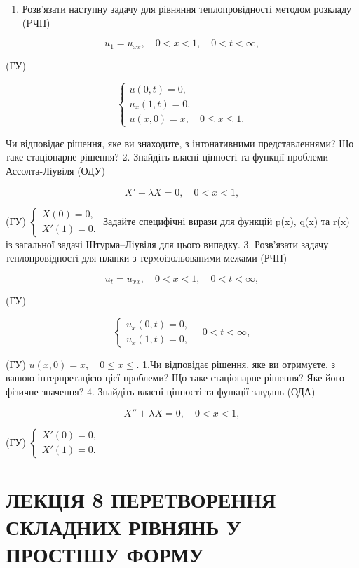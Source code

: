 \documentclass[
  ukrainian,
]{article}
\providecommand{\tightlist}{%
  \setlength{\itemsep}{0pt}\setlength{\parskip}{0pt}}
\begin{document}
\begin{enumerate}
\def\labelenumi{\arabic{enumi}.}
\tightlist
\item
  Розв'язати наступну задачу для рівняння теплопровідності методом
  розкладу (PЧП)
\end{enumerate}

\[
u_1 = u_{xx}, \quad 0 < x < 1, \quad 0 < t < \infty,
\]

(ГУ)

\[
\begin{cases} u(0, t) = 0, \\ u_x(1, t) = 0, \\ u(x, 0) = x, \quad 0 \le x \le 1. \end{cases}
\]

Чи відповідає рішення, яке ви знаходите, з інтонативними
представленнями? Що таке стаціонарне рішення? 2. Знайдіть власні
цінності та функції проблеми Ассолта-Ліувіля (ОДУ)

\[
X' + \lambda X = 0, \quad 0 < x < 1,
\]

(ГУ) \(\begin{cases} X(0) = 0, \\ X'(1) = 0. \end{cases}\) Задайте
специфічні вирази для функцій p(x), q(x) та r(x) із загальної задачі
Штурма--Ліувіля для цього випадку. 3. Розв'язати задачу теплопровідності
для планки з термоізольованими межами (РЧП)

\[
u_t = u_{xx}, \quad 0 < x < 1, \quad 0 < t < \infty,
\]

(ГУ)

\[
\begin{cases} u_x (0, t) = 0, \\ u_x (1, t) = 0, \end{cases} \quad 0 < t < \infty,
\]

(ГУ) \(u(x, 0) = x, \quad 0 \le x \le.\) 1.Чи відповідає рішення, яке ви
отримуєте, з вашою інтерпретацією цієї проблеми? Що таке стаціонарне
рішення? Яке його фізичне значення? 4. Знайдіть власні цінності та
функції завдань (ОДА)

\[
X'' + \lambda X = 0, \quad 0 < x < 1,
\]

(ГУ) \(\begin{cases} X'(0) = 0, \\ X'(1) = 0. \end{cases}\)

\section{ЛЕКЦІЯ 8 ПЕРЕТВОРЕННЯ СКЛАДНИХ РІВНЯНЬ У ПРОСТІШУ
ФОРМУ}\label{ux43bux435ux43aux446ux456ux44f-8-ux43fux435ux440ux435ux442ux432ux43eux440ux435ux43dux43dux44f-ux441ux43aux43bux430ux434ux43dux438ux445-ux440ux456ux432ux43dux44fux43dux44c-ux443-ux43fux440ux43eux441ux442ux456ux448ux443-ux444ux43eux440ux43cux443}
\end{document}
